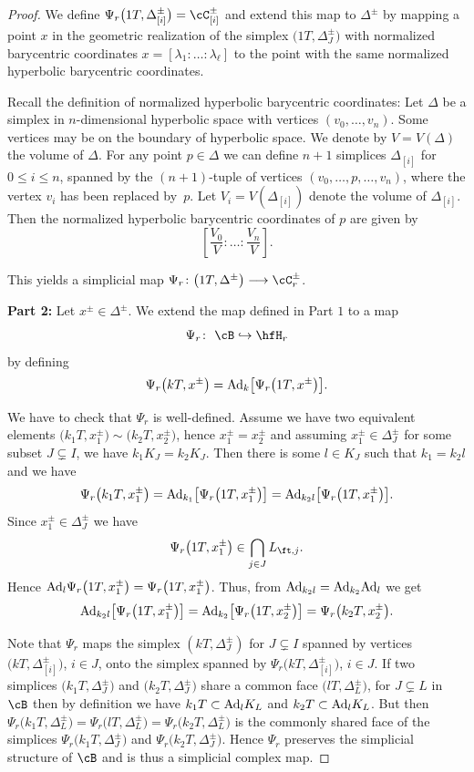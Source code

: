 \begin{proof}
We define $\Psi_r\big(1T,\Delta_{[i]}^\pm\big)= \cC_{[i]}^\pm$ and extend this map to $\Delta^\pm$ by mapping a point $x$ in the geometric realization of the simplex $\big(1 T,\Delta_J^\pm\big)$ with normalized barycentric coordinates $x=[\lambda_1:\dots :\lambda_\ell]$ to the point with the same normalized hyperbolic barycentric coordinates.

Recall the definition of normalized hyperbolic barycentric coordinates: Let $\Delta$ be a simplex in $n$-dimensional hyperbolic space with vertices $(v_0, \dots, v_n)$. Some vertices may be on the boundary of hyperbolic space. We denote by $V= V(\Delta)$ the volume of $\Delta$. For any point $p\in \Delta$ we can define $n+1$ simplices $\Delta_{[i]}$ for $0\leq i\leq n$, spanned by the $(n+1)$-tuple of vertices $(v_0, \dots, p,\dots, v_n)$, where the vertex $v_i$ has been replaced by~$p$. Let $V_i=V(\Delta_{[i]})$ denote the volume of $\Delta_{[i]}$. Then the normalized hyperbolic barycentric coordinates of $p$ are given by
\[\left[\frac{V_0}{V}: \dots :\frac{V_{n}}{V}\right].\]

This yields a simplicial map $\Psi_r\colon \big(1 T, \Delta^\pm\big)\longrightarrow \cC_r^\pm$.

{\bf Part 2:} Let $x^\pm\in \Delta^\pm$. We extend the map defined in Part $1$ to a map \[\Psi_r\colon \ \cB\hookrightarrow \hfH_r\] by defining
\[\Psi_r\big(k T, x^\pm\big)={\rm Ad}_k \big[\Psi_r\big(1 T, x^\pm\big)\big].\]

We have to check that $\Psi_r$ is well-defined. Assume we have two equivalent elements $\big(k_1 T, x_1^\pm\big)\allowbreak \sim \big(k_2 T, x_2^{\pm}\big)$, hence $x_1^\pm=x_2^\pm$ and assuming $x_1^\pm\in \Delta^\pm_J$ for some subset $J\subsetneq I $, we have $k_1 K_J= k_2 K_J$. Then there is some $l\in K_J$ such that $k_1=k_2 l$ and we have
\[\Psi_r\big(k_1 T, x_1^\pm\big)={\rm Ad}_{k_1}\big[\Psi_r\big(1 T, x_1^\pm\big)\big] = {\rm Ad}_{k_2 l} \big[\Psi_r\big(1 T, x_1^\pm\big)\big].\]
Since $x_1^\pm\in \Delta_J^\pm$ we have \[\Psi_r\big(1T, x_1^\pm\big)\in \bigcap_{j\in J} L_{\ft,j}.\]
Hence ${\rm Ad}_l \Psi_r\big(1 T, x_1^\pm\big)=\Psi_r\big(1 T, x_1^\pm\big)$. Thus, from ${\rm Ad}_{k_2 l} = {\rm Ad}_{k_2}{\rm Ad}_{l}$ we get
\[{\rm Ad}_{k_2 l}\big[\Psi_r\big(1 T, x_1^\pm\big)\big]={\rm Ad}_{k_2}\big[\Psi_r\big(1 T, x_2^\pm\big)\big]=\Psi_r\big(k_2 T, x_2^{\pm}\big).\]

Note that $\Psi_r$ maps the simplex $(k T, \Delta_J^\pm)$ for $J\subsetneq I$ spanned by vertices $\big(k T, \Delta^\pm_{[i]}\big)$,
$i\in J$, onto the simplex spanned by $\Psi_r\big(kT, \Delta^\pm_{[i]}\big)$, $i\in J$.
If two simplices $\big(k_1 T, \Delta^\pm_J\big)$ and $\big(k_2 T, \Delta^\pm_J\big)$ share a common face $\big(lT, \Delta^\pm_{L}\big)$,
for $J\subsetneq L$ in $\cB$ then by definition we have $k_1 T\subset {\rm Ad}_l K_L $ and $k_2 T\subset {\rm Ad}_l K_L $. But then
$\Psi_r\big(k_1 T, \Delta^\pm_L\big)=\Psi_r\big(lT, \Delta^\pm_L\big)= \Psi_r\big(k_2 T, \Delta^\pm_L\big)$ is the commonly shared
face of the simplices $\Psi_r\big(k_1 T, \Delta^\pm_J\big)$ and $\Psi_r\big(k_2 T, \Delta^\pm_J\big)$. Hence $\Psi_r$ preserves the simplicial structure of $\cB$ and is thus a simplicial complex map.


\end{proof}
